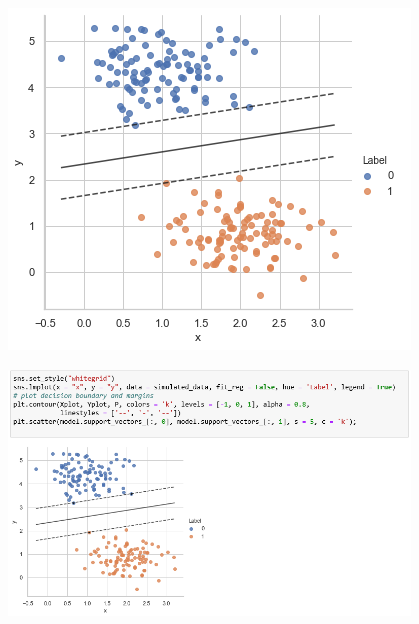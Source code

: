 \documentclass[9pt]{beamer}
\begin{document}
\begin{frame}
\begin{center}
\includegraphics[width=0.8\textwidth]{svm_linear2.png}
\end{center}
\end{frame}

\begin{frame}
\begin{center}
\includegraphics[width=0.8\textwidth]{svm_linear3.png}
\end{center}
\end{frame}
\end{document}
